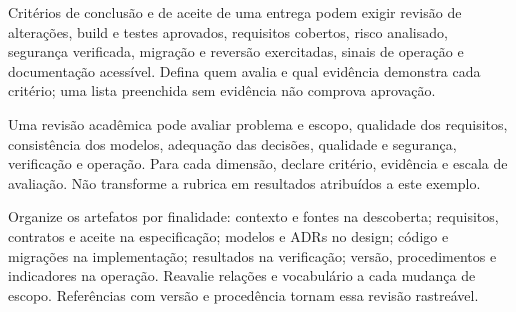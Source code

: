 Critérios de conclusão e de aceite de uma entrega podem exigir revisão de
alterações, build e testes aprovados, requisitos cobertos, risco analisado,
segurança verificada, migração e reversão exercitadas, sinais de operação e
documentação acessível. Defina quem avalia e qual evidência demonstra cada
critério; uma lista preenchida sem evidência não comprova aprovação.

Uma revisão acadêmica pode avaliar problema e escopo, qualidade dos requisitos,
consistência dos modelos, adequação das decisões, qualidade e segurança,
verificação e operação. Para cada dimensão, declare critério, evidência e escala
de avaliação. Não transforme a rubrica em resultados atribuídos a este exemplo.

Organize os artefatos por finalidade: contexto e fontes na descoberta;
requisitos, contratos e aceite na especificação; modelos e ADRs no design;
código e migrações na implementação; resultados na verificação; versão,
procedimentos e indicadores na operação. Reavalie relações e vocabulário a cada
mudança de escopo. Referências com versão e procedência tornam essa revisão
rastreável.

